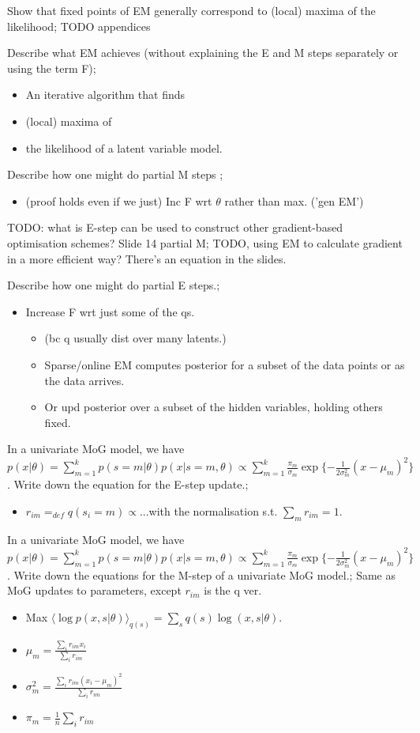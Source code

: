 \documentclass{article}
\begin{document}
Show that fixed points of EM generally correspond to (local) maxima of the likelihood; TODO appendices

Describe what EM achieves (without explaining the E and M steps separately or using the term F); \begin{itemize}
    \item An iterative algorithm that finds 
    \item (local) maxima of
    \item the likelihood of a latent variable model.
\end{itemize}

Describe how one might do partial M steps ;\begin{itemize}
    \item (proof holds even if we just) Inc F wrt $\theta$ rather than max. ('gen EM')
\end{itemize}
TODO: what is E-step can be used to construct other gradient-based optimisation schemes? Slide 14 partial M; TODO, using EM to calculate gradient in a more efficient way? There's an equation in the slides.

Describe how one might do partial E steps.; \begin{itemize}
    \item Increase F wrt just some of the qs. \begin{itemize}
        \item (bc q usually dist over many latents.)
        \item Sparse/online EM computes posterior for a subset of the data points or as the data arrives.
        \item Or upd posterior over a subset of the hidden variables, holding others fixed.
    \end{itemize}
\end{itemize}
  
In a univariate MoG model, we have $p(x|\theta)=\sum_{m=1}^k p(s=m|\theta)p(x|s=m, \theta)\propto \sum^k_{m=1}\frac{\pi_m}{\sigma_m}\exp\{-\frac{1}{2\sigma^2_m}(x-\mu_m)^2\}$. Write down the equation for the E-step update.; \begin{itemize}
    \item $r_{im}=_{def}q(s_i=m)\propto$...with the normalisation s.t. $\sum_mr_{im}=1$.
\end{itemize}
In a univariate MoG model, we have $p(x|\theta)=\sum_{m=1}^k p(s=m|\theta)p(x|s=m, \theta)\propto \sum^k_{m=1}\frac{\pi_m}{\sigma_m}\exp\{-\frac{1}{2\sigma^2_m}(x-\mu_m)^2\}$. Write down the equations for the M-step of a univariate MoG model.; Same as MoG updates to parameters, except $r_{im}$ is the q ver. \begin{itemize}
    \item Max $\langle \log p(x,s|\theta) \rangle_{q(s)} = \sum_s q(s)\log (x,s|\theta)$.
    \item $\mu_m = \frac{\sum_i r_{im}x_i}{\sum_i r_{im}}$
    \item $\sigma^2_m = \frac{\sum_i r_{im}(x_i-\mu_m)^2}{\sum_ir_{im}}$
    \item $\pi_m = \frac{1}{n}\sum_ir_{im}$
\end{itemize}
\end{document}
